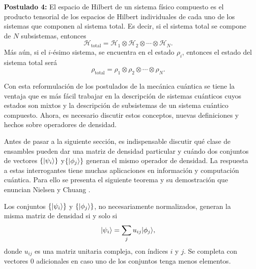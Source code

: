 \textbf{Postulado 4:} El espacio de Hilbert de un sistema físico compuesto es el producto tensorial de los espacios de Hilbert individuales de cada uno de los sistemas que componen al sistema total. Es decir, si el sistema total se compone de $N$ subsistemas, entonces \begin{equation}\label{Htotal4postulado}
	\mathcal{H}_{\text{total}}=\mathcal{H}_1\otimes \mathcal{H}_2\otimes \cdots \otimes \mathcal{H}_N.
\end{equation}
 Más aún, si el $i$-ésimo sistema, se encuentra en el
estado $\rho_i$, entonces  el estado del sistema total será
\begin{equation}\label{rhototal4postulado}
	\rho_{\text{total}}=\rho_1\otimes \rho_2 \otimes \cdots \otimes \rho_N.
\end{equation}


\setlength{\leftskip}{0pt}

Con esta reformulación de los postulados de la mecánica cuántica se tiene la
ventaja que es más fácil trabajar en la descripción de sistemas cuánticos cuyos estados son mixtos y la descripción de subsistemas de un sistema cuántico compuesto. Ahora, es necesario discutir estos conceptos, nuevas definiciones y hechos sobre operadores de densidad. 


Antes de pasar a la siguiente sección, es indispensable discutir qué clase de
ensambles pueden dar una matriz de densidad particular y cuándo dos conjuntos
de vectores $\{|\psi_i\rangle\}$ y$ \{|\phi_j\rangle \}$ generan el mismo operador de
densidad. La respuesta a estas interrogantes tiene muchas aplicaciones en
información y computación cuántica. Para ello se presenta el siguiente
teorema y su demostración que enuncian Nielsen y Chuang
{\cite{nielsen_chuang_2010}}. 
\begin{theorem}
Los conjuntos $\{|\psi_i\rangle\}$ y $ \{|\phi_j\rangle \}$, no necesariamente
normalizados, generan la misma matriz de densidad si y solo si
\begin{equation}\label{teorema2.4}
|\psi_i\rangle= \sum_{j}u_{ij}|\phi_j\rangle,
\end{equation} donde $u_{ij}$ es una matriz unitaria compleja, con índices $i$ y $j$. Se completa con vectores 0 adicionales en caso uno de los conjuntos tenga menos elementos.
\end{theorem}

